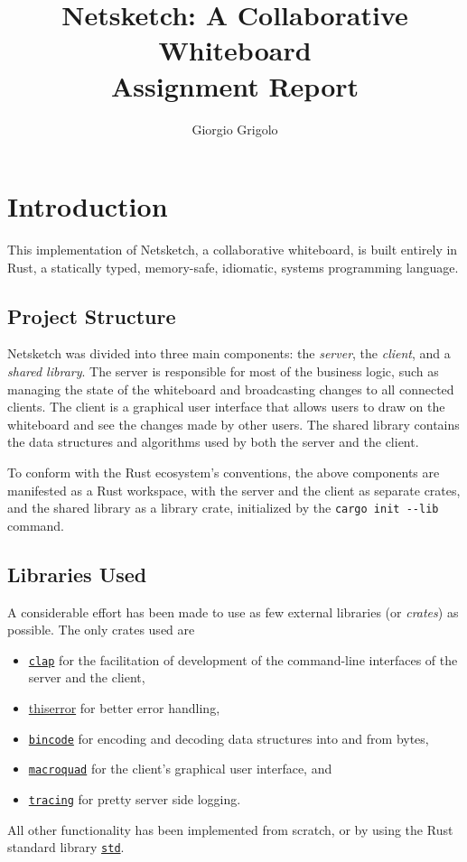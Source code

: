 \documentclass{article}
\title{Netsketch: A Collaborative Whiteboard \\ { \Large Assignment Report} }
\author{Giorgio Grigolo}
\date{}
\newcommand{\code}[1]{\texttt{#1}}
\begin{document}
\maketitle
\tableofcontents

\newpage

\section{Introduction}
This implementation of Netsketch, a collaborative whiteboard, is built entirely in Rust, a statically typed, memory-safe, idiomatic, systems programming language.

\subsection{Project Structure}
Netsketch was divided into three main components: the \textit{server}, the \textit{client}, and a \textit{shared library}. The server is responsible for most of the business logic, such as managing the state of the whiteboard and broadcasting changes to all connected clients. The client is a graphical user interface that allows users to draw on the whiteboard and see the changes made by other users. The shared library contains the data structures and algorithms used by both the server and the client.

To conform with the Rust ecosystem's conventions, the above components are manifested as a Rust workspace, with the server and the client as separate crates, and the shared library as a library crate, initialized by the \code{cargo init {-}{-}lib} command.

\subsection{Libraries Used}
A considerable effort has been made to use as few external libraries (or
\textit{crates}) as possible. The only crates used are
\begin{itemize}
    \item \href{https://docs.rs/clap/latest/clap/}{\code{clap}} for the facilitation of development of the command-line interfaces of the server and the client,
    \item \href{https://docs.rs/thiserror/latest/thiserror/}{thiserror} for better error handling,
    \item \href{https://docs.rs/bincode/latest/bincode/}{\code{bincode}} for encoding and decoding data structures into and from bytes,
    \item \href{https://docs.rs/macroquad/latest/macroquad/}{\code{macroquad}} for the client's graphical user interface, and
    \item \href{https://docs.rs/tracing/latest/tracing/}{\code{tracing}} for pretty server side logging.
\end{itemize}
All other functionality has been implemented from scratch, or by using the Rust standard library \href{https://doc.rust-lang.org/std/}{\code{std}}.
\end{document}
